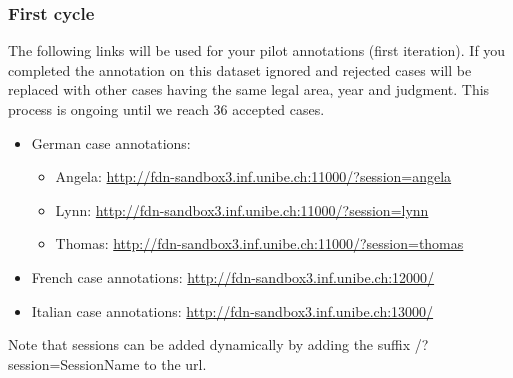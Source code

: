 \documentclass{article}
\begin{document}
\subsubsection{First cycle}\label{1_cycle}
The following links will be used for your pilot annotations (first iteration). If you completed the annotation on this dataset ignored and rejected cases will be replaced with other cases having the same legal area, year and judgment. This process is ongoing until we reach 36 accepted cases. 
\begin{itemize}
\item German case annotations:
\begin{itemize}
\item Angela: \href{http://fdn-sandbox3.inf.unibe.ch:11000/?session=angela}{http://fdn-sandbox3.inf.unibe.ch:11000/?session=angela}
    \item Lynn: \href{http://fdn-sandbox3.inf.unibe.ch:11000/?session=lynn}{http://fdn-sandbox3.inf.unibe.ch:11000/?session=lynn}
    \item Thomas: \href{http://fdn-sandbox3.inf.unibe.ch:11000/?session=thomas}{http://fdn-sandbox3.inf.unibe.ch:11000/?session=thomas}
\end{itemize}
    \item French case annotations: \href{http://fdn-sandbox3.inf.unibe.ch:12000/}{http://fdn-sandbox3.inf.unibe.ch:12000/}
    \item Italian case annotations: \href{http://fdn-sandbox3.inf.unibe.ch:13000/}{http://fdn-sandbox3.inf.unibe.ch:13000/}
\end{itemize}
Note that sessions can be added dynamically by adding the suffix {\color{blue}/?session=SessionName} to the url.
\end{document}
